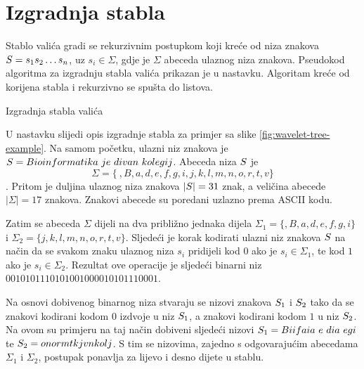 \documentclass[times, utf8, seminar, numeric]{fer}
\begin{document}
\section{Izgradnja stabla}
\label{sec:izgradnja-stabla}

Stablo valića gradi se rekurzivnim postupkom koji kreće od niza znakova $\mathnormal{S} = s_1s_2 \dots s_n$, uz $s_i \in \Sigma$, gdje je $\Sigma$ abeceda  ulaznog niza znakova. \citep{navarro-wavelet-trees-for-all} Pseudokod algoritma za izgradnju stabla valića prikazan je u nastavku. Algoritam kreće od korijena stabla i rekurzivno se spušta do listova.

\begin{algorithm}[H]
 \caption{Izgradnja stabla valića}
\end{algorithm}

U nastavku slijedi opis izgradnje stabla za primjer sa slike \ref{fig:wavelet-tree-example}.
Na samom početku, ulazni niz znakova je $ \mathnormal{S} = Bioinformatika\ je\ divan\  kolegij $. Abeceda niza $\mathnormal{S}$ je
 $$ \Sigma = \{\ ,B,a,d,e,f,g,i,j,k,l,m,n,o,r,t,v\} $$. 
 Pritom je duljina ulaznog niza znakova $ |\mathnormal{S}| =  31 $ znak, a veličina abecede $ |\Sigma| = 17 $ znakova. Znakovi abecede su poredani uzlazno prema ASCII kodu. 

Zatim se abeceda $\Sigma$ dijeli na dva približno jednaka dijela $ \Sigma_1 = \{ ,B,a,d,e,f,g,i\} $ i $ \Sigma_2 = \{j,k,l,m,n,o,r,t,v\} $. Sljedeći je korak kodirati ulazni niz znakova $\mathnormal{S}$ na način da se svakom znaku ulaznog niza $s_i$ pridijeli kod $0$ ako je $ s_i \in \Sigma_1$, te kod $1$ ako je $ s_i \in \Sigma_2 $. Rezultat ove operacije je sljedeći binarni niz $ 0010101110101001000010101110001 $. 

Na osnovi dobivenog binarnog niza stvaraju se nizovi znakova $\mathnormal{S}_1$ i $\mathnormal{S}_2$ tako da se znakovi kodirani kodom $0$ izdvoje u niz $\mathnormal{S}_1$, a znakovi kodirani kodom $1$ u niz $\mathnormal{S}_2$. Na ovom su primjeru na taj način dobiveni sljedeći nizovi $\mathnormal{S}_1 = Biifaia\ e\ dia\ egi$ te $\mathnormal{S}_2 = onormtkjvnkolj$. S tim se nizovima, zajedno s odgovarajućim abecedama $\Sigma_1$ i $\Sigma_2$, postupak ponavlja za lijevo i desno dijete u stablu.
\end{document}
